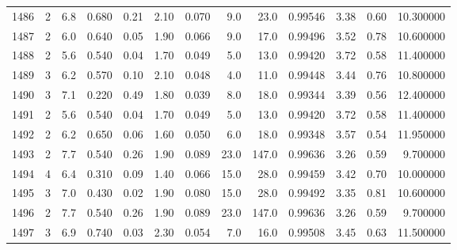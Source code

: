 \begin{tabular}{lrrrrrrrrrrrr}
1486 &        2 &            6.8 &             0.680 &         0.21 &            2.10 &      0.070 &                  9.0 &                  23.0 &  0.99546 &  3.38 &       0.60 &  10.300000 \\
1487 &        2 &            6.0 &             0.640 &         0.05 &            1.90 &      0.066 &                  9.0 &                  17.0 &  0.99496 &  3.52 &       0.78 &  10.600000 \\
1488 &        2 &            5.6 &             0.540 &         0.04 &            1.70 &      0.049 &                  5.0 &                  13.0 &  0.99420 &  3.72 &       0.58 &  11.400000 \\
1489 &        3 &            6.2 &             0.570 &         0.10 &            2.10 &      0.048 &                  4.0 &                  11.0 &  0.99448 &  3.44 &       0.76 &  10.800000 \\
1490 &        3 &            7.1 &             0.220 &         0.49 &            1.80 &      0.039 &                  8.0 &                  18.0 &  0.99344 &  3.39 &       0.56 &  12.400000 \\
1491 &        2 &            5.6 &             0.540 &         0.04 &            1.70 &      0.049 &                  5.0 &                  13.0 &  0.99420 &  3.72 &       0.58 &  11.400000 \\
1492 &        2 &            6.2 &             0.650 &         0.06 &            1.60 &      0.050 &                  6.0 &                  18.0 &  0.99348 &  3.57 &       0.54 &  11.950000 \\
1493 &        2 &            7.7 &             0.540 &         0.26 &            1.90 &      0.089 &                 23.0 &                 147.0 &  0.99636 &  3.26 &       0.59 &   9.700000 \\
1494 &        4 &            6.4 &             0.310 &         0.09 &            1.40 &      0.066 &                 15.0 &                  28.0 &  0.99459 &  3.42 &       0.70 &  10.000000 \\
1495 &        3 &            7.0 &             0.430 &         0.02 &            1.90 &      0.080 &                 15.0 &                  28.0 &  0.99492 &  3.35 &       0.81 &  10.600000 \\
1496 &        2 &            7.7 &             0.540 &         0.26 &            1.90 &      0.089 &                 23.0 &                 147.0 &  0.99636 &  3.26 &       0.59 &   9.700000 \\
1497 &        3 &            6.9 &             0.740 &         0.03 &            2.30 &      0.054 &                  7.0 &                  16.0 &  0.99508 &  3.45 &       0.63 &  11.500000 \\

\end{tabular}
